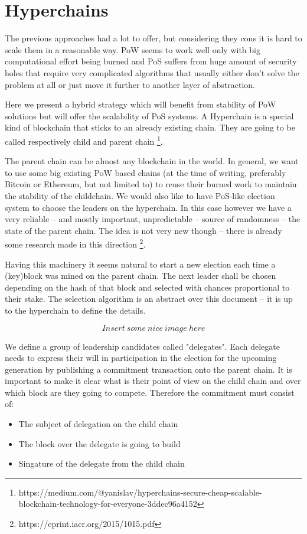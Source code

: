 \section{Hyperchains}

The previous approaches had a lot to offer, but considering they cons it is hard
to scale them in a reasonable way. PoW seems to work well only with big
computational effort being burned and PoS suffers from huge amount of security
holes that require very complicated algorithms that usually either don't solve
the problem at all or just move it further to another layer of abstraction.

Here we present a hybrid strategy which will benefit from stability of PoW
solutions but will offer the scalability of PoS systems. A Hyperchain is a
special kind of blockchain that sticks to an already existing chain. They are
going to be called respectively child and parent chain
\footnote{https://medium.com/@yanislav/hyperchains-secure-cheap-scalable-blockchain-technology-for-everyone-3ddec96a4152}.

The parent chain can be almost any blockchain in the world. In general, we want
to use some big existing PoW based chains (at the time of writing, preferably
Bitcoin or Ethereum, but not limited to) to reuse their burned work to maintain
the stability of the childchain. We would also like to have
PoS-like election system to choose the leaders on the hyperchain. In this case
however we have a very reliable – and mostly important, unpredictable – source
of randomness – the state of the parent chain. The idea is not very new
though – there is already some research made in this direction
\footnote{https://eprint.iacr.org/2015/1015.pdf}.

Having this machinery it seems natural to start a new election each time a
(key)block was mined on the parent chain. The next leader shall be chosen
depending on the hash of that block and selected with chances proportional to
their stake. The selection algorithm is an abstract over this document – it is
up to the hyperchain to define the details.

$$Insert\ some\ nice\ image\ here$$

We define a group of leadership candidates called "delegates". Each delegate
needs to express their will in participation in the election for the upcoming
generation by publishing a commitment transaction onto the parent chain. It is
important to make it clear what is their point of view on the child chain and
over which block are they going to compete.
Therefore the commitment must consist of:
\begin{itemize}
\item The subject of delegation on the child chain
\item The block over the delegate is going to build
\item Singature of the delegate from the child chain
\end{itemize}

